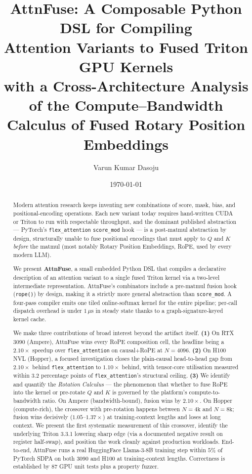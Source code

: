 \documentclass[10pt,twocolumn]{article}
\title{%
  \textbf{AttnFuse: A Composable Python DSL for Compiling\\
  Attention Variants to Fused Triton GPU Kernels}\\[6pt]
  \large with a Cross-Architecture Analysis of the Compute--Bandwidth\\
  Calculus of Fused Rotary Position Embeddings
}
\author{Varun Kumar Dasoju}
\date{\today}
\begin{document}
\maketitle

\begin{abstract}
Modern attention research keeps inventing new combinations of score,
mask, bias, and positional-encoding operations. Each new variant
today requires hand-written CUDA or Triton to run with respectable
throughput, and the dominant published abstraction --- PyTorch's
\texttt{flex\_attention} \texttt{score\_mod} hook --- is a
post-matmul abstraction by design, structurally unable to fuse
positional encodings that must apply to $Q$ and $K$ \emph{before}
the matmul (most notably Rotary Position Embeddings, RoPE, used by
every modern LLM).

We present \textbf{AttnFuse}, a small embedded Python DSL that
compiles a declarative description of an attention variant to a
single fused Triton kernel via a two-level intermediate
representation. AttnFuse's combinators include a pre-matmul fusion
hook (\texttt{rope()}) by design, making it a strictly more general
abstraction than \texttt{score\_mod}. A four-pass compiler emits one
tiled online-softmax kernel for the entire pipeline; per-call
dispatch overhead is under $1\,\mu$s in steady state thanks to a
graph-signature-keyed kernel cache.

We make three contributions of broad interest beyond the artifact
itself. \textbf{(1)} On RTX 3090 (Ampere), AttnFuse wins every RoPE
composition cell, the headline being a $2.10\times$ speedup over
\texttt{flex\_attention} on causal+RoPE at $N{=}4096$. \textbf{(2)}
On H100 NVL (Hopper), a focused investigation closes the
plain-causal head-to-head gap from $2.10\times$ behind
\texttt{flex\_attention} to $1.10\times$ behind, with tensor-core
utilisation measured within $3.2$ percentage points of
\texttt{flex\_attention}'s structural ceiling. \textbf{(3)} We
identify and quantify the \emph{Rotation Calculus} --- the
phenomenon that whether to fuse RoPE into the kernel or pre-rotate
$Q$ and $K$ is governed by the platform's compute-to-bandwidth
ratio. On Ampere (bandwidth-bound), fusion wins by $2.10\times$. On
Hopper (compute-rich), the crossover with pre-rotation happens
between $N{=}4\text{k}$ and $N{=}8\text{k}$; fusion wins decisively
($1.05$--$1.37\times$) at training-context lengths and loses at long
context. We present the first systematic measurement of this
crossover, identify the underlying Triton 3.3.1 lowering sharp edge
(via a documented negative result on register half-swap), and
position the work cleanly against production workloads. End-to-end,
AttnFuse runs a real HuggingFace Llama-3-8B training step within
$5\%$ of PyTorch SDPA on both 3090 and H100 at training-context
lengths. Correctness is established by 87 GPU unit tests plus a
property fuzzer.
\end{abstract}
\end{document}
